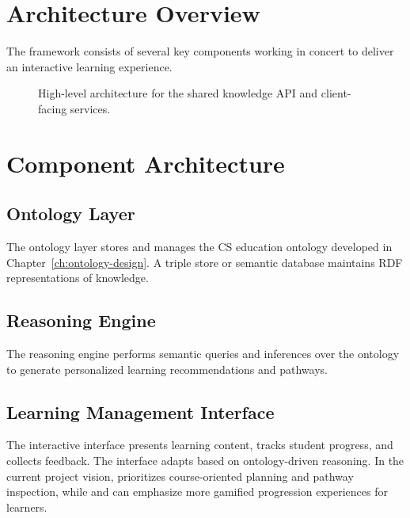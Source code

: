 \section{Architecture Overview}

The framework consists of several key components working in concert to deliver an interactive learning experience.

\KnowledgePlatformVision

\begin{figure}[H]
    \centering
    
    \caption{High-level architecture for the shared knowledge API and client-facing services.}
    \label{fig:knowledge-platform-architecture}
\end{figure}

\section{Component Architecture}

\subsection{Ontology Layer}

The ontology layer stores and manages the CS education ontology developed in Chapter~\ref{ch:ontology-design}. A triple store or semantic database maintains RDF representations of knowledge.

\subsection{Reasoning Engine}

The reasoning engine performs semantic queries and inferences over the ontology to generate personalized learning recommendations and pathways.

\subsection{Learning Management Interface}

The interactive interface presents learning content, tracks student progress, and collects feedback. The interface adapts based on ontology-driven reasoning. In the current project vision, \KnowledgeAtlas{} prioritizes course-oriented planning and pathway inspection, while \AlgorithmicaApp{} and \DisciplinaApp{} can emphasize more gamified progression experiences for learners.

